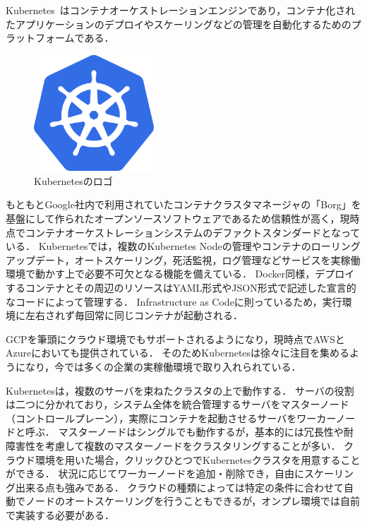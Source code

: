 Kubernetes~\cite{Kubernetes}はコンテナオーケストレーションエンジンであり，コンテナ化されたアプリケーションのデプロイやスケーリングなどの管理を自動化するためのプラットフォームである．

\begin{figure}[htbp]
\begin{center}
    \includegraphics[width=0.4\textwidth]{./figures/kubernetes_logo.png}
    \caption{Kubernetesのロゴ}
\end{center}
\end{figure}

もともとGoogle社内で利用されていたコンテナクラスタマネージャの「Borg」を基盤にして作られたオープンソースソフトウェアであるため信頼性が高く，現時点でコンテナオーケストレーションシステムのデファクトスタンダードとなっている．
Kubernetesでは，複数のKubernetes Nodeの管理やコンテナのローリングアップデート，オートスケーリング，死活監視，ログ管理などサービスを実稼働環境で動かす上で必要不可欠となる機能を備えている．
Docker同様，デプロイするコンテナとその周辺のリソースはYAML形式やJSON形式で記述した宣言的なコードによって管理する．
Infrastructure as Codeに則っているため，実行環境に左右されず毎回常に同じコンテナが起動される．

GCPを筆頭にクラウド環境でもサポートされるようになり，現時点でAWSとAzureにおいても提供されている．
そのためKubernetesは徐々に注目を集めるようになり，今では多くの企業の実稼働環境で取り入れられている．

Kubernetesは，複数のサーバを束ねたクラスタの上で動作する．
サーバの役割は二つに分かれており，システム全体を統合管理するサーバをマスターノード（コントロールプレーン），実際にコンテナを起動させるサーバをワーカーノードと呼ぶ．
マスターノードはシングルでも動作するが，基本的には冗長性や耐障害性を考慮して複数のマスターノードをクラスタリングすることが多い．
クラウド環境を用いた場合，クリックひとつでKubernetesクラスタを用意することができる．
状況に応じてワーカーノードを追加・削除でき，自由にスケーリング出来る点も強みである．
クラウドの種類によっては特定の条件に合わせて自動でノードのオートスケーリングを行うこともできるが，オンプレ環境では自前で実装する必要がある．

